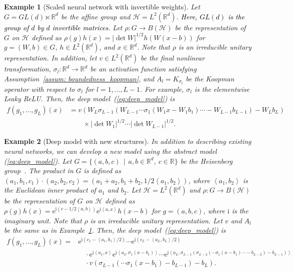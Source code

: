 \documentclass[twoside]{article}
\newtheorem{example}{Example}
\def\mcl#1{\mathcal{#1}}
\def\bracket#1{\left\langle #1\right\rangle}
\def\hil{\mcl{H}}
\def\mr{\mathrm}
\def\red#1{\textcolor{black}{#1}}
\def\eqref#1{(\ref{#1})}
\begin{document}
\begin{example}[Scaled neural network with invertible weights]\label{ex:affine}
Let $G = GL(d) \ltimes \mathbb{R}^d$ be the affine group and $\mathcal{H} = L^2(\mathbb{R}^d)$.
\red{Here, $GL(d)$ is the group of $d$ by $d$ invertible matrices.}
Let $\rho:G\to B(\hil)$ be the representation of $G$ on $\hil$ defined as
$\rho(g)h(x) = |\det W|^{1/2} h(W(x-b))$ for $g=(W,b)\in G$, $h \in L^2(\mathbb{R}^d)$, and $x \in \mathbb{R}^d$.
Note that $\rho$ is an irreducible unitary representation.
In addition, let $v\in L^2(\mathbb{R}^d)$ be the final nonlinear transformation, $\sigma_l:\mathbb{R}^d\to\mathbb{R}^d$ be an activation function satisfying Assumption~\ref{assum: boundedness_koopman}, and $A_l=K_{\sigma_l}$ be the Koopman operator with respect to $\sigma_l$ for $l=1,\ldots,L-1$. 
For example, $\sigma_l$ is the elementwise Leaky ReLU.
Then, the deep model~\eqref{eq:deep_model} is
\begin{align*}
f(g_1,\ldots,g_L)(x) & = v(W_L \sigma_{L-1}(W_{L-1} \cdots \sigma_1(W_1 x - W_1 b_1) \cdots - W_{L-1} b_{L-1}) - W_L b_L)\\
&\qquad\times |\det W_1|^{1/2} \cdots |\det W_{L-1}|^{1/2}.
\end{align*}
\end{example}

\begin{example}[Deep model with new structures]
In addition to describing existing neural networks, we can develop a new model using the abstract model \eqref{eq:deep_model}.
Let $G=\{(a,b,c)\,\mid\, a,b\in\mathbb{R}^d,\ c\in\mathbb{R}\}$ be the Heisenberg group~\citep{thangavelu98}.
The product in $G$ is defined as $(a_1,b_1,c_1)\cdot (a_2,b_2,c_2)=(a_1+a_2,b_1+b_2,1/2\bracket{a_1,b_2})$, where $\bracket{a_1,b_2}$ is the Euclidean inner product of $a_1$ and $b_2$.
Let $\hil=L^2(\mathbb{R}^d)$ and $\rho:G\to B(\hil)$ be the representation of $G$ on $\hil$ defined as $\rho(g)h(x)=\mr{e}^{\mr{i}(c-1/2\bracket{a,b})}\mr{e}^{\mr{i}\bracket{a,x}}h(x-b)$ for $g=(a,b,c)$, where $\mr{i}$ is the imaginary unit.
Note that $\rho$ is an irreducible unitary representation.
Let $v$ and $A_l$ be the same as in Example~\ref{ex:affine}.
Then, the deep model~\eqref{eq:deep_model} is
\begin{align*}
f(g_1,\ldots,g_L)(x) = & \mr{e}^{\mr{i}(c_1-\bracket{a_1,b_1}/2)}\cdots \mr{e}^{\mr{i}(c_L-\bracket{a_L,b_L}/2)}\\
&\quad \cdot\mr{e}^{\mr{i}\bracket{a_1,x}}\mr{e}^{\mr{i}\bracket{a_2,\sigma_1(x-b_1)}}\cdots\mr{e}^{\mr{i}\bracket{a_L,\sigma_{L-1}(\sigma_{L-2}(\cdots\sigma_1(x-b_1)\cdots -b_{L-2})-b_{L-1})}}\\
&\quad \cdot v(\sigma_{L-1}(\cdots\sigma_1(x-b_1)-b_{L-1})-b_L).
\end{align*}
\end{example}
\end{document}
